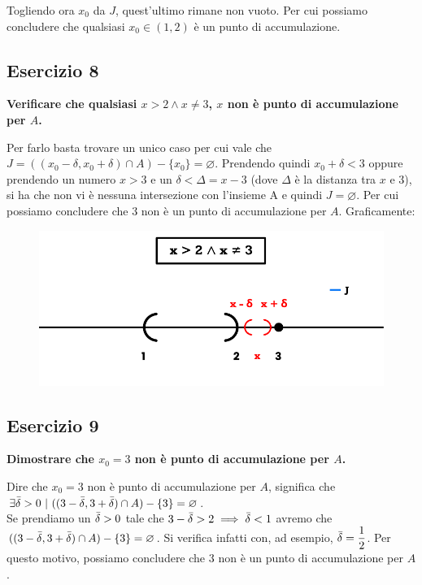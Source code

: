 \documentclass{article}
\begin{document}
\noindent Togliendo ora $x_0$ da $J$, quest'ultimo rimane non vuoto. Per cui possiamo concludere che qualsiasi $x_0 \in (1, 2)$ è un punto di accumulazione.

\subsection{Esercizio 8}
\textbf{Verificare che qualsiasi $x > 2 \wedge x \neq 3$, $x$ non è punto di accumulazione per $A$.}

\noindent Per farlo basta trovare un unico caso per cui vale che $J = ((x_0 - \delta, x_0 + \delta) \cap A) - \{x_0\} = \varnothing$. Prendendo quindi $x_0 + \delta < 3$ oppure prendendo un numero $x > 3$ e un $\delta < \Delta = x - 3$ (dove $\Delta$ è la distanza tra $x$ e $3$), si ha che non vi è nessuna intersezione con l'insieme A e quindi $J = \varnothing$. Per cui possiamo concludere che $3$ non è un punto di accumulazione per $A$. Graficamente:

\begin{figure}[!h]
    \centering
    \includegraphics[width=12cm]{./images/AccPoints12.pdf}
\end{figure}

\subsection{Esercizio 9}
\textbf{Dimostrare che $x_0 = 3$ non è punto di accumulazione per $A$.}

\noindent Dire che $x_0 = 3$ non è punto di accumulazione per $A$, significa che $\exists \Bar{\delta} > 0 \ | \ ((3 - \Bar{\delta}, 3 + \Bar{\delta}) \cap A) - \{3\} = \varnothing$. \\
Se prendiamo un $\Bar{\delta} > 0$ tale che $3 - \Bar{\delta} > 2 \implies \Bar{\delta} < 1$ avremo che $((3 - \Bar{\delta}, 3 + \Bar{\delta}) \cap A) - \{3\} = \varnothing$. Si verifica infatti con, ad esempio, $\Bar{\delta} = \dfrac{1}{2}$. Per questo motivo, possiamo concludere che $3$ non è un punto di accumulazione per $A$.\\
\end{document}

